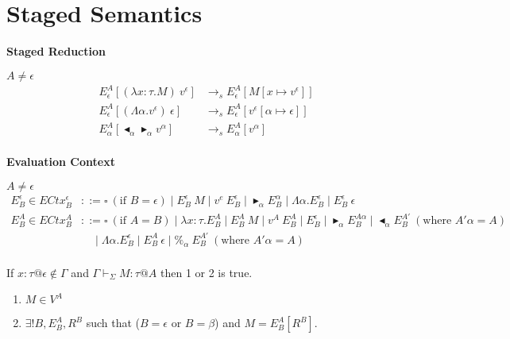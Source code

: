 \documentclass[9pt, a4paper]{extarticle}
\theoremstyle{break}
\newcommand{\figheader}[2]{
  \begin{flushleft}
    #2 {\bf \normalsize #1}
\end{flushleft}}
\newcommand{\G}{\Gamma}
\newcommand{\V}{\vdash_\Sigma}
\newcommand{\TB}{\blacktriangleright}
\newcommand{\TBL}{\blacktriangleleft}
\begin{document}
\section{ Staged Semantics }

\figheader{Staged Reduction}{}
$A \neq \epsilon$\\
\begin{align*}
	E^A_\epsilon [(\lambda x:\tau.M)\ v^\epsilon]       & \longrightarrow_s E^A_\epsilon[M[x\mapsto v^\epsilon]]             \\
	E^A_\epsilon [(\Lambda\alpha.v^\epsilon)\ \epsilon] & \longrightarrow_s E^A_\epsilon[v^\epsilon[\alpha\mapsto \epsilon]] \\
	E^A_\alpha [\TBL_\alpha \TB_\alpha v^\alpha]        & \longrightarrow_s E^A_\alpha[v^\alpha]                             \\
\end{align*}

\figheader{Evaluation Context}{}
$A \neq \epsilon$\\
\begin{align*}
	E^\epsilon_B \in ECtx^\epsilon_B & ::= \square\ (\text{if\ } B = \epsilon) \mid E^\epsilon_B\ M \mid v^e\ E^\epsilon_B
	\mid \TB_\alpha E^\alpha_B \mid \Lambda\alpha.E^\epsilon_B
	\mid E^\epsilon_B\ \epsilon                                                                                                \\
	E^A_B \in ECtx^A_B               & ::= \square\ (\text{if } A = B) \mid \lambda x:\tau.E^A_B \mid E^A_B\ M \mid v^A\ E^A_B
	\mid E^\epsilon_B \mid \TB_\alpha E^{A\alpha}_B
	\mid \TBL_\alpha E^{A'}_B \ (\text{where } A'\alpha = A)                                                                   \\
	                                 & \quad \mid \Lambda\alpha.E^\epsilon_B
	\mid E^A_B\ \epsilon \mid \%_\alpha\ E^{A'}_B \ (\text{where } A'\alpha = A)                                               \\
\end{align*}

\begin{thm}
	If $x:\tau@\epsilon \notin \G$ and $\G \V M : \tau @ A$ then 1 or 2 is true.
	\begin{enumerate}
		\item $ M \in V^A$
		\item $\exists ! B, E^A_B, R^B$ such that ($B = \epsilon$ or $B = \beta$) and $M = E^A_B[R^B]$.
	\end{enumerate}
\end{thm}
\end{document}
